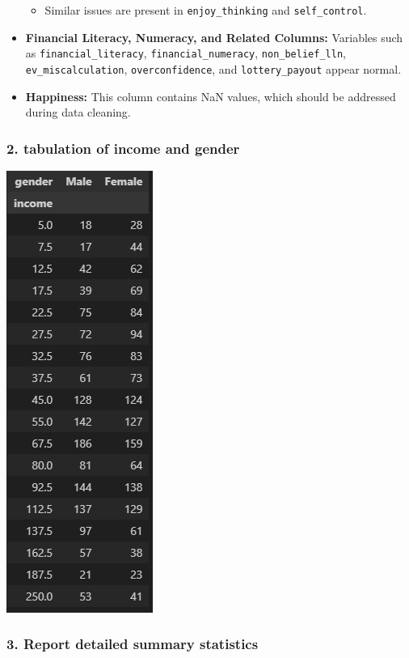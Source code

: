 \documentclass[
  12pt]{article}
\providecommand{\tightlist}{%
  \setlength{\itemsep}{0pt}\setlength{\parskip}{0pt}}\usepackage{longtable,booktabs,array}
\begin{document}
\begin{itemize}
  \begin{itemize}
  \tightlist
  \item
    Similar issues are present in \texttt{enjoy\_thinking} and
    \texttt{self\_control}.
  \end{itemize}
\item
  \textbf{Financial Literacy, Numeracy, and Related Columns:} Variables
  such as \texttt{financial\_literacy}, \texttt{financial\_numeracy},
  \texttt{non\_belief\_lln}, \texttt{ev\_miscalculation},
  \texttt{overconfidence}, and \texttt{lottery\_payout} appear normal.
\item
  \textbf{Happiness:} This column contains NaN values, which should be
  addressed during data cleaning.
\end{itemize}

\subsubsection{2. tabulation of income and
gender}\label{tabulation-of-income-and-gender}

\includegraphics{images/4.png}

\subsubsection{3. Report detailed summary
statistics}\label{report-detailed-summary-statistics}
\end{document}
